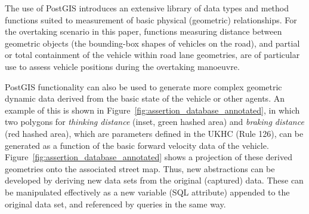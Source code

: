 The use of PostGIS introduces an extensive library of data types and method functions suited to measurement of basic physical (geometric) relationships. For the overtaking scenario in this paper, functions measuring distance between geometric objects (the bounding-box shapes of vehicles on the road), and partial or total containment of the vehicle within road lane geometries, are of particular use to assess vehicle positions during the overtaking manoeuvre.

PostGIS functionality can also be used to generate more complex geometric dynamic data derived from the basic state of the vehicle or other agents. An example of this is shown in Figure~\ref{fig:assertion_database_annotated}, in which two polygons for \textit{thinking distance} (inset, green hashed area) and \textit{braking distance} (red hashed area), which are parameters defined in the UKHC (Rule 126), can be generated as a function of the basic forward velocity data of the vehicle. Figure~\ref{fig:assertion_database_annotated} shows a projection of these derived geometries onto the associated street map. 
%
Thus, new abstractions can be developed by deriving new data sets from the original (captured) data. These can be manipulated effectively as a new variable (SQL attribute) appended to the original data set, and referenced by queries in the same way.
%



